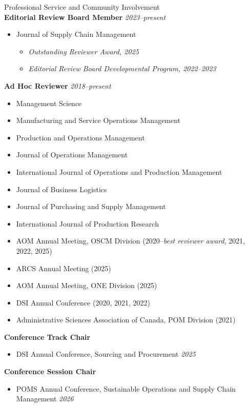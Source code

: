 \documentclass{resume} %
\begin{document}
\begin{rSection}{Professional Service and Community Involvement} 
\ \\
\textbf{Editorial Review Board Member}	\hfill {\em 2023--present}
\begin{itemize}
    \item Journal of Supply Chain Management
    \begin{itemize}
    \item[o] {\em Outstanding Reviewer Award, 2025}
    \item[o] {\em Editorial Review Board Developmental Program, 2022--2023}
\end{itemize}
    \end{itemize}
\textbf{Ad Hoc Reviewer}	\hfill {\em 2018--present}
\begin{itemize}
    \item Management Science
    \item Manufacturing and Service Operations Management
    \item Production and Operations Management
    \item Journal of Operations Management
	\item International Journal of Operations and Production Management
    \item Journal of Business Logistics
    \item Journal of Purchasing and Supply Management
	\item International Journal of Production Research
	\item AOM Annual Meeting, OSCM Division (2020--{\em best reviewer award}, 2021, 2022, 2025)
    \item ARCS Annual Meeting (2025)
    \item AOM Annual Meeting, ONE Division (2025)
	\item DSI Annual Conference (2020, 2021, 2022)
	\item Administrative Sciences Association of Canada, POM Division (2021)
\end{itemize}
\textbf{Conference Track Chair}
\begin{itemize}
    \item DSI Annual Conference, Sourcing and Procurement	\hfill {\em2025}
\end{itemize}
\textbf{Conference Session Chair}
\begin{itemize}
    \item POMS Annual Conference, Sustainable Operations and Supply Chain Management \hfill {\em2026}

\end{itemize}
\end{rSection}
\end{document}
